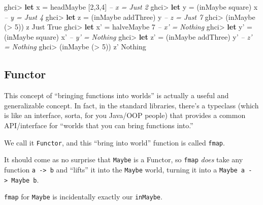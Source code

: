 \documentclass[]{article}
\newenvironment{Shaded}{}{}
\newcommand{\KeywordTok}[1]{\textcolor[rgb]{0.00,0.44,0.13}{\textbf{{#1}}}}
\newcommand{\DataTypeTok}[1]{\textcolor[rgb]{0.56,0.13,0.00}{{#1}}}
\newcommand{\DecValTok}[1]{\textcolor[rgb]{0.25,0.63,0.44}{{#1}}}
\newcommand{\CommentTok}[1]{\textcolor[rgb]{0.38,0.63,0.69}{\textit{{#1}}}}
\newcommand{\FunctionTok}[1]{\textcolor[rgb]{0.02,0.16,0.49}{{#1}}}
\newcommand{\NormalTok}[1]{{#1}}
\begin{document}
\begin{Shaded}
\begin{Highlighting}[]
\NormalTok{ghci}\FunctionTok{>} \KeywordTok{let} \NormalTok{x }\FunctionTok{=} \NormalTok{headMaybe [}\DecValTok{2}\NormalTok{,}\DecValTok{3}\NormalTok{,}\DecValTok{4}\NormalTok{]        }\CommentTok{-- x = Just 2}
\NormalTok{ghci}\FunctionTok{>} \KeywordTok{let} \NormalTok{y }\FunctionTok{=} \NormalTok{(inMaybe square) x       }\CommentTok{-- y = Just 4}
\NormalTok{ghci}\FunctionTok{>} \KeywordTok{let} \NormalTok{z }\FunctionTok{=} \NormalTok{(inMaybe addThree) y     }\CommentTok{-- z = Just 7}
\NormalTok{ghci}\FunctionTok{>} \NormalTok{(inMaybe (}\FunctionTok{>} \DecValTok{5}\NormalTok{)) z}
\DataTypeTok{Just} \DataTypeTok{True}
\NormalTok{ghci}\FunctionTok{>} \KeywordTok{let} \NormalTok{x' }\FunctionTok{=} \NormalTok{halveMaybe }\DecValTok{7}            \CommentTok{-- x' = Nothing}
\NormalTok{ghci}\FunctionTok{>} \KeywordTok{let} \NormalTok{y' }\FunctionTok{=} \NormalTok{(inMaybe square) x'     }\CommentTok{-- y' = Nothing}
\NormalTok{ghci}\FunctionTok{>} \KeywordTok{let} \NormalTok{z' }\FunctionTok{=} \NormalTok{(inMaybe addThree) y'   }\CommentTok{-- z' = Nothing}
\NormalTok{ghci}\FunctionTok{>} \NormalTok{(inMaybe (}\FunctionTok{>} \DecValTok{5}\NormalTok{)) z'}
\DataTypeTok{Nothing}
\end{Highlighting}
\end{Shaded}

\subsection{Functor}\label{functor}

This concept of ``bringing functions into worlds'' is actually a useful
and generalizable concept. In fact, in the standard libraries, there's a
typeclass (which is like an interface, sorta, for you Java/OOP people)
that provides a common API/interface for ``worlds that you can bring
functions into.''

We call it \texttt{Functor}, and this ``bring into world'' function is
called \texttt{fmap}.

It should come as no surprise that \texttt{Maybe} is a Functor, so
\texttt{fmap} \emph{does} take any function
\texttt{a\ -\textgreater{}\ b} and ``lifts'' it into the \texttt{Maybe}
world, turning it into a \texttt{Maybe\ a\ -\textgreater{}\ Maybe\ b}.

\texttt{fmap} for \texttt{Maybe} is incidentally exactly our
\texttt{inMaybe}.
\end{document}
